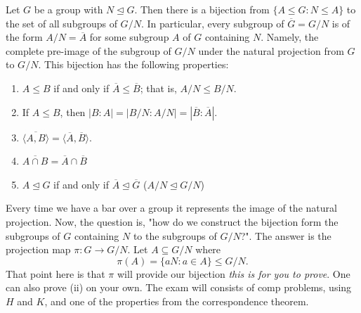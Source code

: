\begin{theorem}
Let \( G  \) be a group with \( N \trianglelefteq G  \). Then there is a bijection from \( \{  A \leq G  : N \leq A   \}  \) to the set of all subgroups of \( G /N  \). In particular, every subgroup of \( \overline{G} = G / N  \) is of the form \( A / N = \overline{A}  \) for some subgroup \( A  \) of \( G  \) containing \( N  \). Namely, the complete pre-image of the subgroup of \( G / N  \) under the natural projection from \( G  \) to \( G / N  \). This bijection has the following properties:
\begin{enumerate}
    \item[(i)] \( A \leq B  \) if and only if \( \overline{A} \leq \overline{B} \); that is, \( A / N \leq B / N  \).
    \item[(ii)] If \( A \leq B  \), then \( | B : A  |  = |  B / N  : A / N  |  = | \overline{B } : \overline{A} |. \)
    \item[(iii)] \( \overline{\langle A , B \rangle} = \langle \overline{A}  ,  \overline{B} \rangle \).
    \item[(iv)] \( \overline{A \cap B} = \overline{A} \cap \overline{B} \)
    \item[(v)] \( A \trianglelefteq G  \) if and only if \( \overline{A} \trianglelefteq \overline{G} \) (\( A / N \trianglelefteq G / N \))
\end{enumerate}
\end{theorem}
Every time we have a bar over a group it represents the image of the natural projection. Now, the question is, "how do we construct the bijection form the subgroups of \( G  \) containing \( N  \) to the subgroups of \( G / N  \)?". The answer is the projection map \( \pi : G \to G / N  \). Let \( A \subseteq  G / N  \) where
\[  \pi(A) = \{  a N : a \in A  \}  \leq G / N.  \]
That point here is that \( \pi  \) will provide our bijection \textit{this is for you to prove}. One can also prove (ii) on your own. The exam will consists of comp problems, using \( H  \) and \( K  \), and one of the properties from the correspondence theorem.

